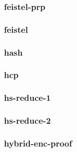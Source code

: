 \begin{frame} \frametitle{feistel-prp}
\begin{figure}
\begin{center}

\end{center}
\end{figure}
\end{frame}
\begin{frame} \frametitle{feistel}
\begin{figure}
\begin{center}

\end{center}
\end{figure}
\end{frame}
\begin{frame} \frametitle{hash}
\begin{figure}
\begin{center}

\end{center}
\end{figure}
\end{frame}
\begin{frame} \frametitle{hcp}
\begin{figure}
\begin{center}

\end{center}
\end{figure}
\end{frame}
\begin{frame} \frametitle{hs-reduce-1}
\begin{figure}
\begin{center}

\end{center}
\end{figure}
\end{frame}
\begin{frame} \frametitle{hs-reduce-2}
\begin{figure}
\begin{center}

\end{center}
\end{figure}
\end{frame}
\begin{frame} \frametitle{hybrid-enc-proof}
\begin{figure}
\begin{center}

\end{center}
\end{figure}
\end{frame}
